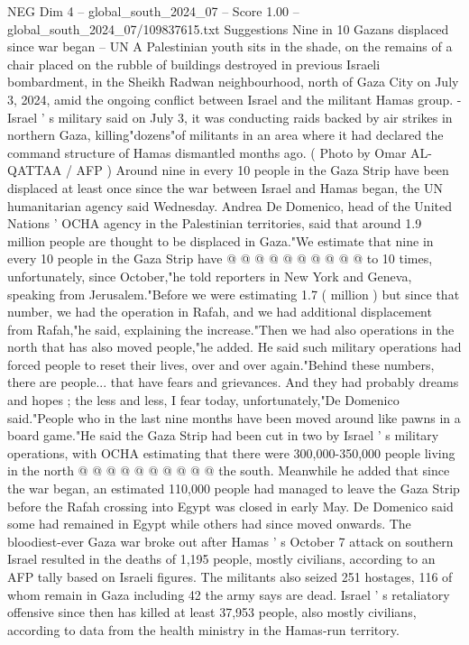 \begin{textsample}{NEG Dim 4 – global\_south\_2024\_07 – Score 1.00 – global\_south\_2024\_07/109837615.txt}  \label{ex:f4_neg_345}
Suggestions Nine in 10 Gazans displaced since war began -- UN A Palestinian youth sits in the shade, on the remains of a chair placed on the rubble of buildings destroyed in previous Israeli bombardment, in the Sheikh Radwan neighbourhood, north of Gaza City on July 3, 2024, amid the ongoing conflict between Israel and the militant Hamas group. - Israel ' s military said on July 3, it was conducting raids backed by air strikes in northern Gaza, killing"dozens"of militants in an area where it had declared the command structure of Hamas dismantled months ago. ( Photo by Omar AL-QATTAA / AFP ) Around nine in every 10 people in the Gaza Strip have been displaced at least once since the war between Israel and Hamas began, the UN humanitarian agency said Wednesday.
Andrea De Domenico, head of the United Nations ' OCHA agency in the Palestinian territories, said that around 1.9 million people are thought to be displaced in Gaza."We estimate that nine in every 10 people in the Gaza Strip have @ @ @ @ @ @ @ @ @ @ to 10 times, unfortunately, since October,"he told reporters in New York and Geneva, speaking from Jerusalem."Before we were estimating 1.7 ( million ) but since that number, we had the operation in Rafah, and we had additional displacement from Rafah,"he said, explaining the increase."Then we had also operations in the north that has also moved people,"he added.
He said such military operations had forced people to reset their lives, over and over again."Behind these numbers, there are people... that have fears and grievances.
And they had probably dreams and hopes ; the less and less, I fear today, unfortunately,"De Domenico said."People who in the last nine months have been moved around like pawns in a board game."He said the Gaza Strip had been cut in two by Israel ' s military operations, with OCHA estimating that there were 300,000-350,000 people living in the north @ @ @ @ @ @ @ @ @ @ the south.
Meanwhile he added that since the war began, an estimated 110,000 people had managed to leave the Gaza Strip before the Rafah crossing into Egypt was closed in early May.
De Domenico said some had remained in Egypt while others had since moved onwards.
The bloodiest-ever Gaza war broke out after Hamas ' s October 7 attack on southern Israel resulted in the deaths of 1,195 people, mostly civilians, according to an AFP tally based on Israeli figures.
The militants also seized 251 hostages, 116 of whom remain in Gaza including 42 the army says are dead.
Israel ' s retaliatory offensive since then has killed at least 37,953 people, also mostly civilians, according to data from the health ministry in the Hamas-run territory.

\end{textsample}
